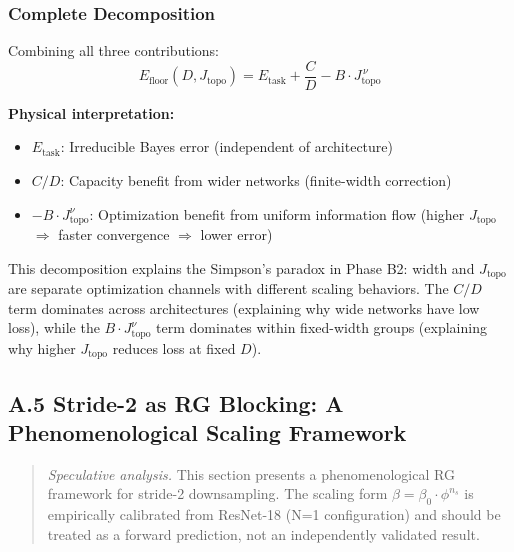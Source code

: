 \subsubsection{Complete Decomposition}

Combining all three contributions:
\begin{equation}
\boxed{E_{\mathrm{floor}}(D, J_{\mathrm{topo}}) = E_{\mathrm{task}} + \frac{C}{D} - B \cdot J_{\mathrm{topo}}^{\,\nu}}
\end{equation}

\textbf{Physical interpretation:}
\begin{itemize}
\item $E_{\mathrm{task}}$: Irreducible Bayes error (independent of architecture)
\item $C/D$: Capacity benefit from wider networks (finite-width correction)
\item $-B \cdot J_{\mathrm{topo}}^{\nu}$: Optimization benefit from uniform information flow (higher $J_{\mathrm{topo}}$ $\Rightarrow$ faster convergence $\Rightarrow$ lower error)
\end{itemize}

This decomposition explains the Simpson's paradox in Phase B2: width and $J_{\mathrm{topo}}$ are separate optimization channels with different scaling behaviors. The $C/D$ term dominates across architectures (explaining why wide networks have low loss), while the $B \cdot J_{\mathrm{topo}}^{\nu}$ term dominates within fixed-width groups (explaining why higher $J_{\mathrm{topo}}$ reduces loss at fixed $D$).


\subsection{A.5 Stride-2 as RG Blocking: A Phenomenological Scaling Framework}\label{sec:stride2-rg}

\begin{quote}
\textit{Speculative analysis.} This section presents a phenomenological RG framework for stride-2 downsampling. The scaling form $\beta = \beta_0 \cdot \phi^{n_s}$ is empirically calibrated from ResNet-18 (N=1 configuration) and should be treated as a forward prediction, not an independently validated result.
\end{quote}

